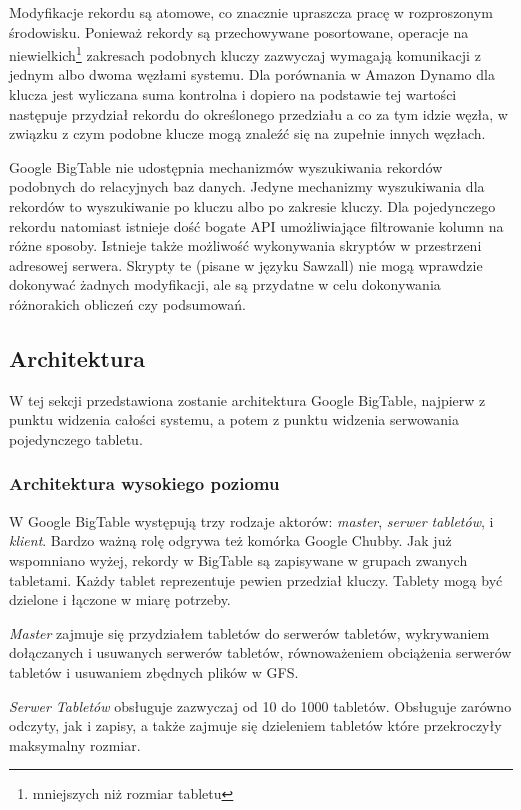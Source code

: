 Modyfikacje rekordu są atomowe, co znacznie upraszcza pracę w rozproszonym środowisku.
Ponieważ rekordy są przechowywane posortowane, operacje na niewielkich\footnote{mniejszych niż rozmiar tabletu} zakresach podobnych kluczy zazwyczaj wymagają komunikacji z jednym albo dwoma węzłami systemu.
Dla porównania w Amazon Dynamo dla klucza jest wyliczana suma kontrolna i dopiero na podstawie tej wartości następuje przydział rekordu do określonego przedziału a co za tym idzie węzła, w związku z czym podobne klucze mogą znaleźć się na zupełnie innych węzłach.

Google BigTable nie udostępnia mechanizmów wyszukiwania rekordów podobnych do relacyjnych baz danych.
Jedyne mechanizmy wyszukiwania dla rekordów to wyszukiwanie po kluczu albo po zakresie kluczy.
Dla pojedynczego rekordu natomiast istnieje dość bogate API umożliwiające filtrowanie kolumn na różne sposoby.
Istnieje także możliwość wykonywania skryptów w przestrzeni adresowej serwera.
Skrypty te (pisane w języku Sawzall) nie mogą wprawdzie dokonywać żadnych modyfikacji, ale są przydatne w celu dokonywania różnorakich obliczeń czy podsumowań.

\subsection*{Architektura}

W tej sekcji przedstawiona zostanie architektura Google BigTable, najpierw z punktu widzenia całości systemu, a potem z punktu widzenia serwowania pojedynczego tabletu.

\subsubsection*{Architektura wysokiego poziomu}

W Google BigTable występują trzy rodzaje aktorów: \emph{master}, \emph{serwer tabletów}, i \emph{klient}.
Bardzo ważną rolę odgrywa też komórka Google Chubby.
Jak już wspomniano wyżej, rekordy w BigTable są zapisywane w grupach zwanych tabletami.
Każdy tablet reprezentuje pewien przedział kluczy.
Tablety mogą być dzielone i łączone w miarę potrzeby.

\emph{Master} zajmuje się przydziałem tabletów do serwerów tabletów, wykrywaniem dołączanych i usuwanych serwerów tabletów, równoważeniem obciążenia serwerów tabletów i usuwaniem zbędnych plików w GFS.

\emph{Serwer Tabletów} obsługuje zazwyczaj od 10 do 1000 tabletów.
Obsługuje zarówno odczyty, jak i zapisy, a także zajmuje się dzieleniem tabletów które przekroczyły maksymalny rozmiar.

